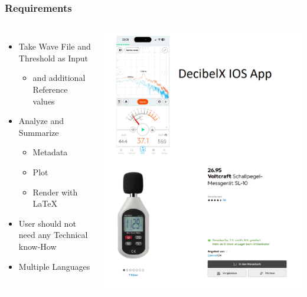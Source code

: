\begin{frame}
    \frametitle{Requirements}
    \begin{columns}
        \begin{itemize}[<+->]
            \large
            \item Take Wave File and Threshold as Input
            \begin{itemize}
                \large
                \item and additional Reference values
            \end{itemize}
            \item Analyze and Summarize 
            \begin{itemize}
                \large
                \item Metadata
                \item Plot
                \item Render with LaTeX
            \end{itemize}
            \item User should not need any Technical know-How
            \item Multiple Languages
        \end{itemize}
        \includegraphics[width=0.8\linewidth]{../assets/min_and_max_measuring.png}
    \end{columns}
\end{frame}
